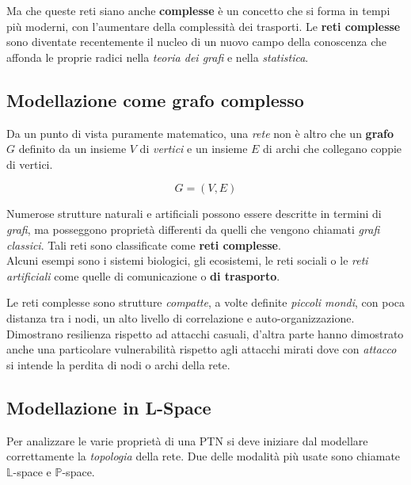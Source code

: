 Ma che queste reti siano anche \textbf{complesse} è un concetto che si forma in tempi più moderni, con l'aumentare della complessità dei trasporti. Le \textbf{reti complesse} sono diventate recentemente il nucleo di un nuovo campo della conoscenza \cite{vonFerber2012LondonParis} che affonda le proprie radici nella \textit{teoria dei grafi} e nella \textit{statistica}.

\subsection{Modellazione come grafo complesso}
Da un punto di vista puramente matematico, una \textit{rete} non è altro che un \textbf{grafo} $G$ definito da un insieme $V$ di \textit{vertici} e un insieme $E$ di archi che collegano coppie di vertici.

$$
G = (V, E)
$$

Numerose strutture naturali e artificiali possono essere descritte in termini di \textit{grafi}, ma posseggono proprietà differenti da quelli che vengono chiamati \textit{grafi classici}. Tali reti sono classificate come \textbf{reti complesse}. \\
Alcuni esempi sono i sistemi biologici, gli ecosistemi, le reti sociali o le \textit{reti artificiali} come quelle di comunicazione o \textbf{di trasporto}.

Le reti complesse sono strutture \textit{compatte}, a volte definite \textit{piccoli mondi}, con poca distanza tra i nodi, un alto livello di correlazione e auto-organizzazione. Dimostrano resilienza rispetto ad attacchi casuali, d'altra parte hanno dimostrato anche una particolare vulnerabilità rispetto agli attacchi mirati dove con \textit{attacco} si intende la perdita di nodi o archi della rete.

\subsection{Modellazione in L-Space}
Per analizzare le varie proprietà di una PTN si deve iniziare dal modellare correttamente la \textit{topologia} della rete. Due delle modalità più usate sono chiamate $\mathbb{L}$-space e $\mathbb{P}$-space.

